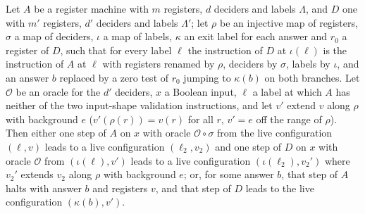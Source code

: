 \begin{lemma}
\label{Complexity.LogProg.astep_embed}
\leanok
{}
Let $A$ be a register machine with $m$ registers, $d$ deciders and labels $\Lambda$, and $D$ one
with $m'$ registers, $d'$ deciders and labels $\Lambda'$; let $\rho$ be an injective map of
registers, $\sigma$ a map of deciders, $\iota$ a map of labels, $\kappa$ an exit label for each
answer and $r_0$ a register of $D$, such that for every label $\ell$ the instruction of $D$ at
$\iota(\ell)$ is the instruction of $A$ at $\ell$ with registers renamed by $\rho$, deciders by
$\sigma$, labels by $\iota$, and an answer $b$ replaced by a zero test of $r_0$ jumping to
$\kappa(b)$ on both branches. Let $\mathcal O$ be an oracle for the $d'$ deciders, $x$ a
Boolean input, $\ell$ a label at which $A$ has neither of the two input-shape validation
instructions, and let $v'$ extend $v$ along $\rho$ with background $e$ ($v'(\rho(r))=v(r)$
for all $r$, $v'=e$ off the range of $\rho$). Then either one step of $A$ on $x$ with oracle
$\mathcal O\circ\sigma$ from the live configuration $(\ell,v)$ leads to a live configuration
$(\ell_2,v_2)$ and one step of $D$ on $x$ with oracle $\mathcal O$ from $(\iota(\ell),v')$
leads to a live configuration $(\iota(\ell_2),v_2')$ where $v_2'$ extends $v_2$ along $\rho$
with background $e$; or, for some answer $b$, that step of $A$ halts with answer $b$ and
registers $v$, and that step of $D$ leads to the live configuration $(\kappa(b),v')$.
\end{lemma}

